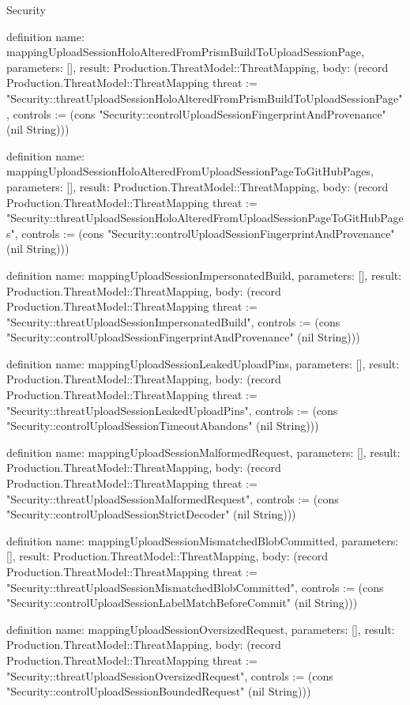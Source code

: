 \begin{lexlean}{Security}
\begin{semanticmodule}
definition{
  name: mappingUploadSessionHoloAlteredFromPrismBuildToUploadSessionPage,
  parameters: [],
  result: Production.ThreatModel::ThreatMapping,
  body: (record Production.ThreatModel::ThreatMapping {threat := "Security::threatUploadSessionHoloAlteredFromPrismBuildToUploadSessionPage", controls := (cons "Security::controlUploadSessionFingerprintAndProvenance" (nil String))})
}

definition{
  name: mappingUploadSessionHoloAlteredFromUploadSessionPageToGitHubPages,
  parameters: [],
  result: Production.ThreatModel::ThreatMapping,
  body: (record Production.ThreatModel::ThreatMapping {threat := "Security::threatUploadSessionHoloAlteredFromUploadSessionPageToGitHubPages", controls := (cons "Security::controlUploadSessionFingerprintAndProvenance" (nil String))})
}

definition{
  name: mappingUploadSessionImpersonatedBuild,
  parameters: [],
  result: Production.ThreatModel::ThreatMapping,
  body: (record Production.ThreatModel::ThreatMapping {threat := "Security::threatUploadSessionImpersonatedBuild", controls := (cons "Security::controlUploadSessionFingerprintAndProvenance" (nil String))})
}

definition{
  name: mappingUploadSessionLeakedUploadPins,
  parameters: [],
  result: Production.ThreatModel::ThreatMapping,
  body: (record Production.ThreatModel::ThreatMapping {threat := "Security::threatUploadSessionLeakedUploadPins", controls := (cons "Security::controlUploadSessionTimeoutAbandons" (nil String))})
}

definition{
  name: mappingUploadSessionMalformedRequest,
  parameters: [],
  result: Production.ThreatModel::ThreatMapping,
  body: (record Production.ThreatModel::ThreatMapping {threat := "Security::threatUploadSessionMalformedRequest", controls := (cons "Security::controlUploadSessionStrictDecoder" (nil String))})
}

definition{
  name: mappingUploadSessionMismatchedBlobCommitted,
  parameters: [],
  result: Production.ThreatModel::ThreatMapping,
  body: (record Production.ThreatModel::ThreatMapping {threat := "Security::threatUploadSessionMismatchedBlobCommitted", controls := (cons "Security::controlUploadSessionLabelMatchBeforeCommit" (nil String))})
}

definition{
  name: mappingUploadSessionOversizedRequest,
  parameters: [],
  result: Production.ThreatModel::ThreatMapping,
  body: (record Production.ThreatModel::ThreatMapping {threat := "Security::threatUploadSessionOversizedRequest", controls := (cons "Security::controlUploadSessionBoundedRequest" (nil String))})
}


\end{semanticmodule}
\end{lexlean}
